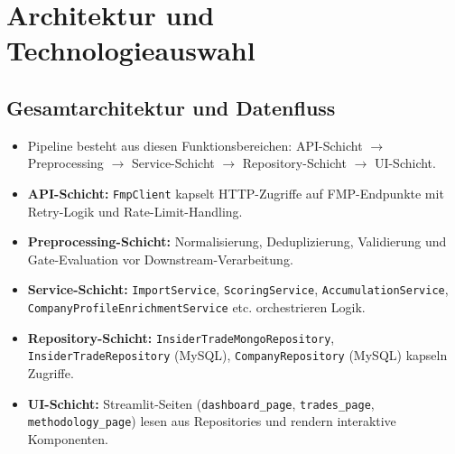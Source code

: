 \section{Architektur und Technologieauswahl}

\subsection{Gesamtarchitektur und Datenfluss}
\begin{itemize}
  \item Pipeline besteht aus diesen Funktionsbereichen: API-Schicht $\rightarrow$ Preprocessing $\rightarrow$ Service-Schicht $\rightarrow$ Repository-Schicht $\rightarrow$ UI-Schicht. %
  \item \textbf{API-Schicht:} \texttt{FmpClient} kapselt HTTP-Zugriffe auf FMP-Endpunkte mit Retry-Logik und Rate-Limit-Handling. %
  \item \textbf{Preprocessing-Schicht:} Normalisierung, Deduplizierung, Validierung und Gate-Evaluation vor Downstream-Verarbeitung. %
  \item \textbf{Service-Schicht:} \texttt{ImportService}, \texttt{ScoringService}, \texttt{AccumulationService}, \texttt{CompanyProfileEnrichmentService} etc. orchestrieren Logik. %
  \item \textbf{Repository-Schicht:} \texttt{InsiderTradeMongoRepository}, \texttt{InsiderTradeRepository} (MySQL), \texttt{CompanyRepository} (MySQL) kapseln Zugriffe. %
  \item \textbf{UI-Schicht:} Streamlit-Seiten (\texttt{dashboard\_page}, \texttt{trades\_page}, \texttt{methodology\_page}) lesen aus Repositories und rendern interaktive Komponenten. %
\end{itemize}

